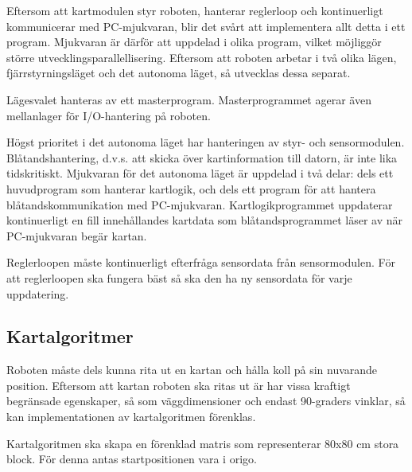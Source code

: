 Eftersom att kartmodulen styr roboten, hanterar reglerloop och kontinuerligt
kommunicerar med PC-mjukvaran, blir det svårt att implementera allt detta i ett
program. Mjukvaran är därför att uppdelad i olika program, vilket möjliggör
större utvecklingsparallellisering. Eftersom att roboten arbetar i två olika
lägen, fjärrstyrningsläget och det autonoma läget, så utvecklas dessa separat.

Lägesvalet hanteras av ett masterprogram. Masterprogrammet agerar även
mellanlager för I/O-hantering på roboten.

Högst prioritet i det autonoma läget har hanteringen av styr- och
sensormodulen. Blåtandshantering, d.v.s. att skicka över kartinformation till
datorn, är inte lika tidskritiskt. Mjukvaran för det autonoma läget är uppdelad
i två delar: dels ett huvudprogram som hanterar kartlogik, och dels ett program
för att hantera blåtandskommunikation med PC-mjukvaran. Kartlogikprogrammet
uppdaterar kontinuerligt en fill innehållandes kartdata som blåtandsprogrammet
läser av när PC-mjukvaran begär kartan.

Reglerloopen måste kontinuerligt efterfråga sensordata från sensormodulen. För
att reglerloopen ska fungera bäst så ska den ha ny sensordata för varje
uppdatering.


\subsection{Kartalgoritmer}

Roboten måste dels kunna rita ut en kartan och hålla koll på sin
nuvarande position. Eftersom att kartan roboten ska ritas ut är har vissa
kraftigt begränsade egenskaper, så som väggdimensioner och endast 90-graders
vinklar, så kan implementationen av kartalgoritmen förenklas.

Kartalgoritmen ska skapa en förenklad matris som representerar 80x80 cm stora
block. För denna antas startpositionen vara i origo.

